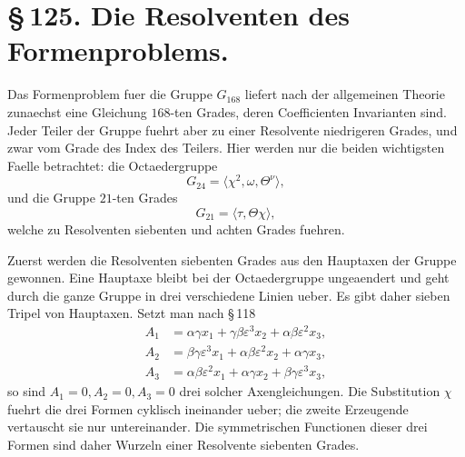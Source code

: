 \documentclass[11pt]{article}
\providecommand{\eps}{\varepsilon}
\providecommand{\eps}{\varepsilon}
\begin{document}
\section*{\S\,125. Die Resolventen des Formenproblems.}

Das Formenproblem fuer die Gruppe \(G_{168}\) liefert nach der allgemeinen Theorie zunaechst eine Gleichung \(168\)-ten Grades, deren Coefficienten Invarianten sind. Jeder Teiler der Gruppe fuehrt aber zu einer Resolvente niedrigeren Grades, und zwar vom Grade des Index des Teilers. Hier werden nur die beiden wichtigsten Faelle betrachtet: die Octaedergruppe
\begin{equation}
G_{24}=\langle \chi^2,\omega,\Theta^\nu\rangle,
\tag{1}
\end{equation}
und die Gruppe \(21\)-ten Grades
\begin{equation}
G_{21}=\langle \tau,\Theta\chi\rangle,
\tag{2}
\end{equation}
welche zu Resolventen siebenten und achten Grades fuehren.

Zuerst werden die Resolventen siebenten Grades aus den Hauptaxen der Gruppe gewonnen. Eine Hauptaxe bleibt bei der Octaedergruppe ungeaendert und geht durch die ganze Gruppe in drei verschiedene Linien ueber. Es gibt daher sieben Tripel von Hauptaxen. Setzt man nach \S\,118
\begin{equation}
\begin{aligned}
A_1&=\alpha\gamma x_1+\gamma\beta\eps^3x_2+\alpha\beta\eps^2x_3,\\
A_2&=\beta\gamma\eps^3x_1+\alpha\beta\eps^2x_2+\alpha\gamma x_3,\\
A_3&=\alpha\beta\eps^2x_1+\alpha\gamma x_2+\beta\gamma\eps^3x_3,
\end{aligned}
\tag{3}
\end{equation}
so sind \(A_1=0,A_2=0,A_3=0\) drei solcher Axengleichungen. Die Substitution \(\chi\) fuehrt die drei Formen cyklisch ineinander ueber; die zweite Erzeugende vertauscht sie nur untereinander. Die symmetrischen Functionen dieser drei Formen sind daher Wurzeln einer Resolvente siebenten Grades.
\end{document}
